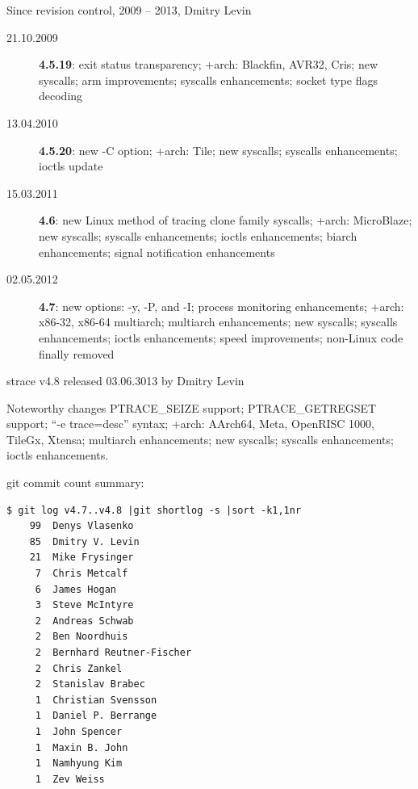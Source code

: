 \documentclass[unicode]{beamer}
\begin{document}
\begin{frame}{Since revision control, 2009 -- 2013, Dmitry Levin}
	\begin{description}
		\item[21.10.2009] {\bf 4.5.19}:
			exit status transparency;
			+arch: Blackfin, AVR32, Cris;
			new syscalls;
			arm improvements;
			syscalls enhancements;
			socket type flags decoding
		\item[13.04.2010] {\bf 4.5.20}:
			new -C option;
			+arch: Tile;
			new syscalls;
			syscalls enhancements;
			ioctls update
		\item[15.03.2011] {\bf 4.6}:
			new Linux method of tracing clone family syscalls;
			+arch: MicroBlaze;
			new syscalls;
			syscalls enhancements;
			ioctls enhancements;
			biarch enhancements;
			signal notification enhancements
		\item[02.05.2012] {\bf 4.7}:
			new options: -y, -P, and -I;
			process monitoring enhancements;
			+arch: x86-32, x86-64 multiarch;
			multiarch enhancements;
			new syscalls;
			syscalls enhancements;
			ioctls enhancements;
			speed improvements;
			non-Linux code finally removed
	\end{description}
\end{frame}

\begin{frame}[fragile]{strace v4.8 released 03.06.3013 by Dmitry Levin}
\begin{block}{Noteworthy changes}
\scriptsize
PTRACE\_SEIZE support;
PTRACE\_GETREGSET support;
``-e trace=desc'' syntax;
+arch: AArch64, Meta, OpenRISC 1000, TileGx, Xtensa;
multiarch enhancements;
new syscalls;
syscalls enhancements;
ioctls enhancements.
\end{block}
git commit count summary:
\scriptsize
\begin{verbatim}
$ git log v4.7..v4.8 |git shortlog -s |sort -k1,1nr
    99	Denys Vlasenko
    85	Dmitry V. Levin
    21	Mike Frysinger
     7	Chris Metcalf
     6	James Hogan
     3	Steve McIntyre
     2	Andreas Schwab
     2	Ben Noordhuis
     2	Bernhard Reutner-Fischer
     2	Chris Zankel
     2	Stanislav Brabec
     1	Christian Svensson
     1	Daniel P. Berrange
     1	John Spencer
     1	Maxin B. John
     1	Namhyung Kim
     1	Zev Weiss
\end{verbatim}
\end{frame}
\end{document}

